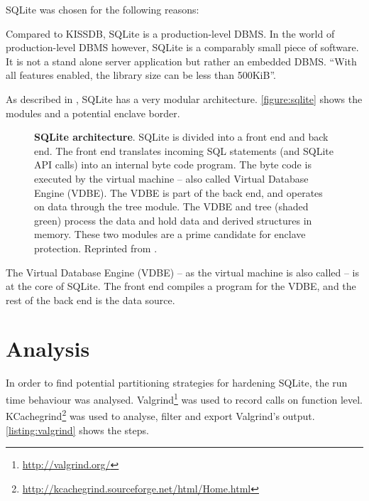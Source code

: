 SQLite was chosen for the following reasons:\label{ID_313554394}
\begin{description}\label{ID_280210927}
\item[Comparably small:]\label{ID_216465543}
Compared to KISSDB, SQLite is a production-level DBMS.\label{ID_260649904}
In the world of production-level DBMS however, SQLite is a comparably small piece of software.\label{ID_60475352}
It is not a stand alone server application but rather an embedded DBMS.\label{ID_1987907892}
``With all features enabled, the library size can be less than 500KiB''.\label{ID_1067948369}
\item[Modularised:]\label{ID_1961074220}
As described in \cite[ch. 2.6]{Haldar2015}, SQLite has a very modular architecture.\label{ID_400628669}
\autoref{figure:sqlite} shows the modules and a potential enclave border.\label{ID_585278429}
\begin{figure}[htbp]
\makebox[\textwidth][c]{
}\caption{\textbf{SQLite architecture}.\label{ID_164795786}
SQLite is divided into a front end and back end.\label{ID_1041545778}
The front end translates incoming SQL statements (and SQLite API calls) into an internal byte code program.\label{ID_1398562963}
The byte code is executed by the virtual machine -- also called Virtual Database Engine (VDBE).\label{ID_909322831}
The VDBE is part of the back end, and operates on data through the tree module.\label{ID_1735468020}
The VDBE and tree (shaded green) process the data and hold data and derived structures in memory.\label{ID_1147095879}
These two modules are a prime candidate for enclave protection.\label{ID_422975755}
Reprinted from \cite{Haldar2015}.\label{ID_218459745}
\label{ID_1131489379}\label{figure:sqlite}}
\end{figure}


The Virtual Database Engine (VDBE) -- as the virtual machine is also called -- is at the core of SQLite.\label{ID_714086818}
The front end compiles a program for the VDBE, and the rest of the back end is the data source.\label{ID_700484480}
\end{description}\label{ID_362500943}

\section{Analysis\label{ID_1912692200}}
In order to find potential partitioning strategies for hardening SQLite, the run time behaviour was analysed.\label{ID_1625555362}
Valgrind\footnote{\url{http://valgrind.org/}} was used to record calls on function level.\label{ID_1885616035}
KCachegrind\footnote{\url{http://kcachegrind.sourceforge.net/html/Home.html}} was used to analyse, filter and export Valgrind's output.\label{ID_1345077215}
\autoref{listing:valgrind} shows the steps.\label{ID_1364557603}
\label{ID_572841935}

